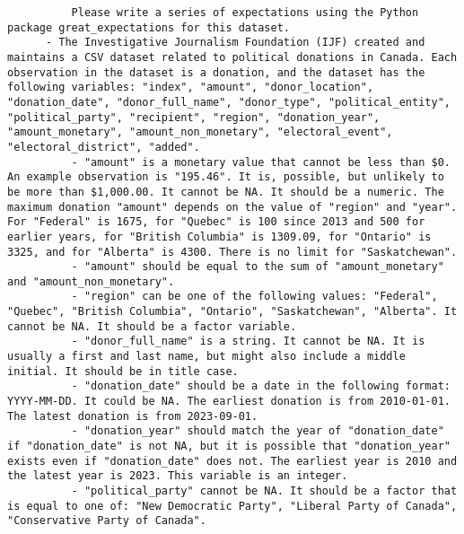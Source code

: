 \documentclass[
  letterpaper,
  DIV=11,
  numbers=noendperiod]{scrartcl}
\begin{document}
\begin{itemize}
\begin{lstlisting}
          Please write a series of expectations using the Python package great_expectations for this dataset.
      - The Investigative Journalism Foundation (IJF) created and maintains a CSV dataset related to political donations in Canada. Each observation in the dataset is a donation, and the dataset has the following variables: "index", "amount", "donor_location", "donation_date", "donor_full_name", "donor_type", "political_entity", "political_party", "recipient", "region", "donation_year", "amount_monetary", "amount_non_monetary", "electoral_event", "electoral_district", "added". 
          - "amount" is a monetary value that cannot be less than $0. An example observation is "195.46". It is, possible, but unlikely to be more than $1,000.00. It cannot be NA. It should be a numeric. The maximum donation "amount" depends on the value of "region" and "year". For "Federal" is 1675, for "Quebec" is 100 since 2013 and 500 for earlier years, for "British Columbia" is 1309.09, for "Ontario" is 3325, and for "Alberta" is 4300. There is no limit for "Saskatchewan".
          - "amount" should be equal to the sum of "amount_monetary" and "amount_non_monetary".
          - "region" can be one of the following values: "Federal", "Quebec", "British Columbia", "Ontario", "Saskatchewan", "Alberta". It cannot be NA. It should be a factor variable.
          - "donor_full_name" is a string. It cannot be NA. It is usually a first and last name, but might also include a middle initial. It should be in title case.
          - "donation_date" should be a date in the following format: YYYY-MM-DD. It could be NA. The earliest donation is from 2010-01-01. The latest donation is from 2023-09-01.
          - "donation_year" should match the year of "donation_date" if "donation_date" is not NA, but it is possible that "donation_year" exists even if "donation_date" does not. The earliest year is 2010 and the latest year is 2023. This variable is an integer.
          - "political_party" cannot be NA. It should be a factor that is equal to one of: "New Democratic Party", "Liberal Party of Canada", "Conservative Party of Canada".


\end{lstlisting}
\end{itemize}
\end{document}

